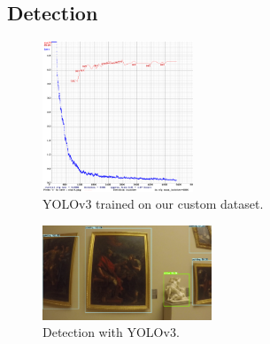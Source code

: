 \subsection{Detection}



\begin{figure}[b!]
    \centering
        \includegraphics[width=0.4\textwidth]{pictures/painting_detection/training-v3.png}
    \caption{YOLOv3 trained on our custom dataset.}
    \label{fig:training-v3}
\end{figure}

\begin{figure}[h!]
    \centering
        \includegraphics[width=0.45\textwidth]{pictures/painting_detection/yolo-detection2.PNG}
    \caption{Detection with YOLOv3.}
    \label{fig:yolo_detection}
\end{figure}



